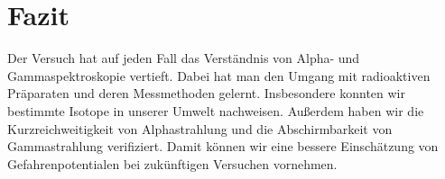 

\chapter{Fazit}
\label{chap:fazit}
Der Versuch hat auf jeden Fall das Verständnis von Alpha- und Gammaspektroskopie vertieft. Dabei hat man den Umgang mit radioaktiven 
Präparaten und deren Messmethoden gelernt. Insbesondere konnten wir bestimmte Isotope in unserer Umwelt nachweisen. Außerdem haben wir die Kurzreichweitigkeit von 
Alphastrahlung und die Abschirmbarkeit von Gammastrahlung verifiziert. Damit können wir eine bessere Einschätzung von Gefahrenpotentialen 
bei zukünftigen Versuchen vornehmen. 

